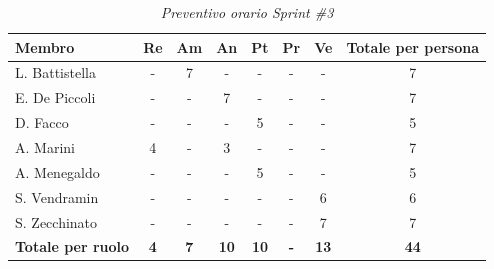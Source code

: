 \documentclass[a4paper, 10pt, colorlinks=true, linkcolor=black, urlcolor=blue, citecolor=blue, hidelinks]{article}
\renewcommand{\arraystretch}{1.2}
\begin{document}
\begin{table}[H]
    \centering
    \renewcommand{\arraystretch}{1.4}
    \begin{tabular}{|l|c|c|c|c|c|c|c|}
        \hline
        \rowcolor{bluBitless!15}
        \textbf{Membro} & \textbf{Re} & \textbf{Am} & \textbf{An} & \textbf{Pt} & \textbf{Pr} & \textbf{Ve} & \textbf{Totale per persona} \\
        \hline
        L. Battistella & - & 7 & - & - & - & - & 7 \\ \hline
        E. De Piccoli & - & - & 7 & - & - & - & 7 \\ \hline
        D. Facco & - & - & - & 5 & - & - & 5 \\ \hline
        A. Marini & 4 & - & 3 & - & - & - & 7 \\ \hline
        A. Menegaldo & - & - & - & 5 & - & - & 5 \\ \hline
        S. Vendramin & - & - & - & - & - & 6 & 6 \\ \hline
        S. Zecchinato & - & - & - & - & - & 7 & 7 \\ \hline
        \rowcolor{bluBitless!8}
        \textbf{Totale per ruolo} & \textbf{4} & \textbf{7} & \textbf{10} & \textbf{10} & \textbf{-} & \textbf{13} & \textbf{44} \\
        \hline
    \end{tabular}
    \caption{\textit{Preventivo orario Sprint \#3}}
\end{table}
\end{document}
